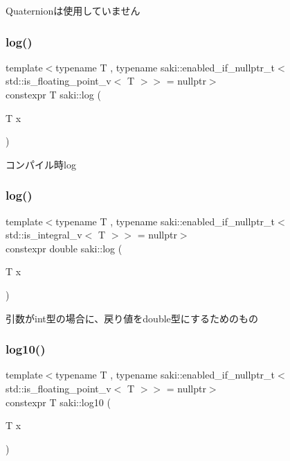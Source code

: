 Quaternionは使用していません \mbox{\label{namespacesaki_a64136b916afd50ceb9bfb93ae12c63fb}} 
\subsubsection{\texorpdfstring{log()}{log()}\hspace{0.1cm}{\footnotesize\ttfamily [1/2]}}
{\footnotesize\ttfamily template$<$typename T , typename saki\+::enabled\+\_\+if\+\_\+nullptr\+\_\+t$<$ std\+::is\+\_\+floating\+\_\+point\+\_\+v$<$ T $>$$>$  = nullptr$>$ \\
constexpr T saki\+::log (\begin{DoxyParamCaption}\item[{T}]{x }\end{DoxyParamCaption})}



コンパイル時log 

\mbox{\label{namespacesaki_a7f260fd4311e2bd21ae770f8aed6fa81}} 
\subsubsection{\texorpdfstring{log()}{log()}\hspace{0.1cm}{\footnotesize\ttfamily [2/2]}}
{\footnotesize\ttfamily template$<$typename T , typename saki\+::enabled\+\_\+if\+\_\+nullptr\+\_\+t$<$ std\+::is\+\_\+integral\+\_\+v$<$ T $>$$>$  = nullptr$>$ \\
constexpr double saki\+::log (\begin{DoxyParamCaption}\item[{T}]{x }\end{DoxyParamCaption})}



引数がint型の場合に、戻り値をdouble型にするためのもの 

\mbox{\label{namespacesaki_aa1a5f3dfe15009e9e985b8b0647211e6}} 
\subsubsection{\texorpdfstring{log10()}{log10()}\hspace{0.1cm}{\footnotesize\ttfamily [1/2]}}
{\footnotesize\ttfamily template$<$typename T , typename saki\+::enabled\+\_\+if\+\_\+nullptr\+\_\+t$<$ std\+::is\+\_\+floating\+\_\+point\+\_\+v$<$ T $>$$>$  = nullptr$>$ \\
constexpr T saki\+::log10 (\begin{DoxyParamCaption}\item[{T}]{x }\end{DoxyParamCaption})}



